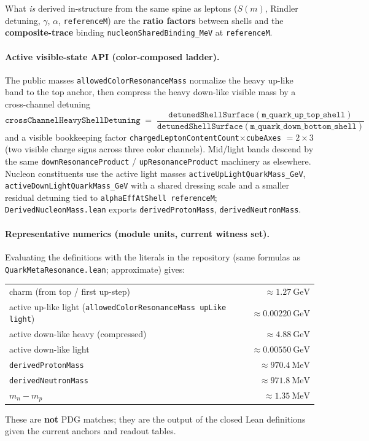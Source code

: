 \documentclass[11pt]{article}
\begin{document}
What \emph{is} derived in-structure from the same spine as leptons ($S(m)$, Rindler detuning, $\gamma$, $\alpha$, \texttt{referenceM}) are the \textbf{ratio factors} between shells and the \textbf{composite-trace} binding \texttt{nucleonSharedBinding\_MeV} at \texttt{referenceM}.

\paragraph{Active visible-state API (color-composed ladder).}
The public masses \texttt{allowedColorResonanceMass} normalize the heavy up-like band to the top anchor, then compress the heavy down-like visible mass by a cross-channel detuning
\[
  \texttt{crossChannelHeavyShellDetuning}
  \;=\;
  \frac{\texttt{detunedShellSurface}(\texttt{m\_quark\_up\_top\_shell})}{\texttt{detunedShellSurface}(\texttt{m\_quark\_down\_bottom\_shell})}
\]
and a visible bookkeeping factor \texttt{chargedLeptonContentCount}$\times$\texttt{cubeAxes} $=2\times 3$ (two visible charge signs across three color channels). Mid/light bands descend by the same \texttt{downResonanceProduct} / \texttt{upResonanceProduct} machinery as elsewhere. Nucleon constituents use the active light masses \texttt{activeUpLightQuarkMass\_GeV}, \texttt{activeDownLightQuarkMass\_GeV} with a shared dressing scale and a smaller residual detuning tied to \texttt{alphaEffAtShell referenceM}; \texttt{DerivedNucleonMass.lean} exports \texttt{derivedProtonMass}, \texttt{derivedNeutronMass}.

\paragraph{Representative numerics (module units, current witness set).}
Evaluating the definitions with the literals in the repository (same formulas as \texttt{QuarkMetaResonance.lean}; approximate) gives:
\begin{center}
\begin{tabular}{l r}
  charm (from top / first up-step) & $\approx 1.27\ \mathrm{GeV}$ \\
  active up-like light (\texttt{allowedColorResonanceMass upLike light}) & $\approx 0.00220\ \mathrm{GeV}$ \\
  active down-like heavy (compressed) & $\approx 4.88\ \mathrm{GeV}$ \\
  active down-like light & $\approx 0.00550\ \mathrm{GeV}$ \\
  \texttt{derivedProtonMass} & $\approx 970.4\ \mathrm{MeV}$ \\
  \texttt{derivedNeutronMass} & $\approx 971.8\ \mathrm{MeV}$ \\
  $m_n - m_p$ & $\approx 1.35\ \mathrm{MeV}$
\end{tabular}
\end{center}
These are \textbf{not} PDG matches; they are the output of the closed Lean definitions given the current anchors and readout tables.
\end{document}
